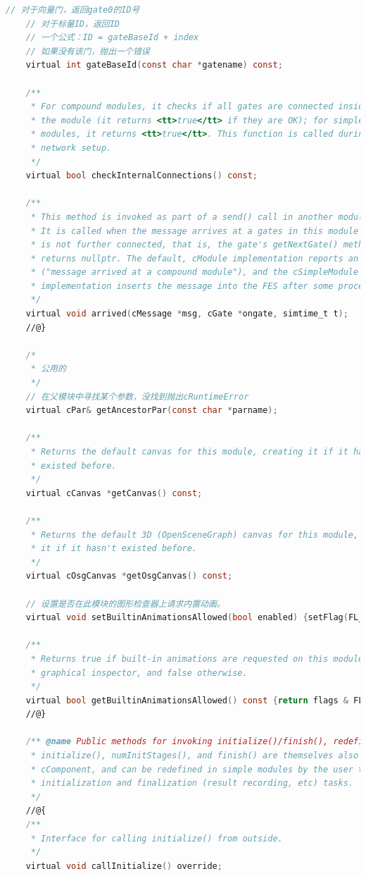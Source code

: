 \begin{lstlisting}[language=c]
    // 对于向量门，返回gate0的ID号
    // 对于标量ID，返回ID
    // 一个公式：ID = gateBaseId + index
    // 如果没有该门，抛出一个错误
    virtual int gateBaseId(const char *gatename) const;

    /**
     * For compound modules, it checks if all gates are connected inside
     * the module (it returns <tt>true</tt> if they are OK); for simple
     * modules, it returns <tt>true</tt>. This function is called during
     * network setup.
     */
    virtual bool checkInternalConnections() const;

    /**
     * This method is invoked as part of a send() call in another module.
     * It is called when the message arrives at a gates in this module which
     * is not further connected, that is, the gate's getNextGate() method
     * returns nullptr. The default, cModule implementation reports an error
     * ("message arrived at a compound module"), and the cSimpleModule
     * implementation inserts the message into the FES after some processing.
     */
    virtual void arrived(cMessage *msg, cGate *ongate, simtime_t t);
    //@}

    /*
     * 公用的
     */
    // 在父模块中寻找某个参数，没找到抛出cRuntimeError
    virtual cPar& getAncestorPar(const char *parname);

    /**
     * Returns the default canvas for this module, creating it if it hasn't
     * existed before.
     */
    virtual cCanvas *getCanvas() const;

    /**
     * Returns the default 3D (OpenSceneGraph) canvas for this module, creating
     * it if it hasn't existed before.
     */
    virtual cOsgCanvas *getOsgCanvas() const;

    // 设置是否在此模块的图形检查器上请求内置动画。
    virtual void setBuiltinAnimationsAllowed(bool enabled) {setFlag(FL_BUILTIN_ANIMATIONS, enabled);}

    /**
     * Returns true if built-in animations are requested on this module's
     * graphical inspector, and false otherwise.
     */
    virtual bool getBuiltinAnimationsAllowed() const {return flags & FL_BUILTIN_ANIMATIONS;}
    //@}

    /** @name Public methods for invoking initialize()/finish(), redefined from cComponent.
     * initialize(), numInitStages(), and finish() are themselves also declared in
     * cComponent, and can be redefined in simple modules by the user to perform
     * initialization and finalization (result recording, etc) tasks.
     */
    //@{
    /**
     * Interface for calling initialize() from outside.
     */
    virtual void callInitialize() override;


\end{lstlisting}
